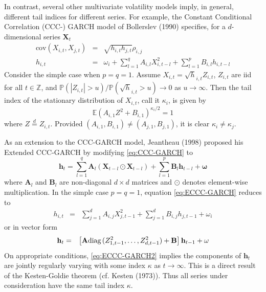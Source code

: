 \documentclass{article}
\newcommand{\E}{
  \mathbb{E}
}
\renewcommand{\P}{
  \mathbb{P}
}
\newcommand{\1}[1]{
  \mathbf{1}_{\{#1\}}
}
\newcommand{\diag}{
  \text{diag\,}
}
\renewcommand\vec[1]{
  \mathbf{#1}
}
\newcommand\cov{
  \text{cov}
}
\newcommand\mtx[1]{
  \mathbf{#1}
}
\begin{document}
In contrast, several other multivariate volatility models imply, in
general, different tail indices for different series. For example, the
Constant Conditional Correlation (CCC-) GARCH model of Bollerslev
(1990) \cite{bollerslev1990modelling} specifies, for a $d$-dimensional
series $\vec X_t$
\begin{eqnarray}
  \cov(X_{i,t}, X_{j,t}) &=& \sqrt{h_{i,t} h_{j,t}} \rho_{i,j}
  \nonumber \\
  h_{i,t} &=& \omega_i + \sum_{l=1}^q A_{i,l} X_{i, t-l}^2 +
  \sum_{l=1}^p B_{i,l} h_{i, t-l} \label{eq:CCC-GARCH}
\end{eqnarray}
Consider the simple case when $p=q=1$. Assume
$X_{i, t} = \sqrt h_{i,t} Z_{i,t}$, $Z_{i, t}$ are iid for
all $t \in \mathbb Z$, and $\P(|Z_{i,t}| > u)/\P(\sqrt h_{i,t} > u) \to 0$ as
$u \to \infty$. Then the tail index of the stationary distribution of
$X_{i,t}$, call it $\kappa_i$, is given by
\[
\E (A_{i, 1} Z^2 + B_{i, 1})^{\kappa_i / 2} = 1
\]
where $Z \overset{d}{=} Z_{i,t}$.
Provided $(A_{i,1}, B_{i,1}) \neq (A_{j,1}, B_{j,1})$, it is clear
$\kappa_i \neq \kappa_j$.

As an extension to the CCC-GARCH model, Jeantheau (1998)
\cite{jeantheau1998strong} proposed his Extended CCC-GARCH by
modifying \eqref{eq:CCC-GARCH} to
\begin{equation}
  \label{eq:ECCC-GARCH}
  \vec h_t =
  \sum_{l=1}^q \mtx A_{l} (\vec X_{t-l} \odot \vec X_{t-l})
  +
  \sum_{l=1}^p \mtx B_{l} \vec h_{t-l}
  +
  \vec \omega
\end{equation}
where $\mtx A_l$ and $\mtx B_l$ are non-diagonal $d \times d$ matrices
and $\odot$ denotes element-wise multiplication. In the simple case $p=q=1$,
equation \eqref{eq:ECCC-GARCH} reduces to
\begin{eqnarray*}
  h_{i,t} &=&
  \sum_{j=1}^d A_{i,j} X_{j, t-1}^2
  + \sum_{j=1}^d B_{i,j} h_{j, t-1}
  + \omega_i
\end{eqnarray*}
or in vector form
\begin{eqnarray}
  \vec h_t &=& \left[
    \mtx A \diag(Z_{1, t-1}^2, \dots, Z_{d, t-1}^2) + \mtx B
    \right] \vec h_{t-1} + \vec \omega
  \label{eq:ECCC-GARCH2}
\end{eqnarray}
On appropriate conditions, \eqref{eq:ECCC-GARCH2} implies the
components of $\vec h_t$ are jointly regularly varying with some index
$\kappa$ as $t \to \infty$. This is a direct result of the Kesten-Goldie
theorem (cf. Kesten (1973)\cite{Kesten1973}). Thus all series under
consideration have the same tail index $\kappa$.
\end{document}
